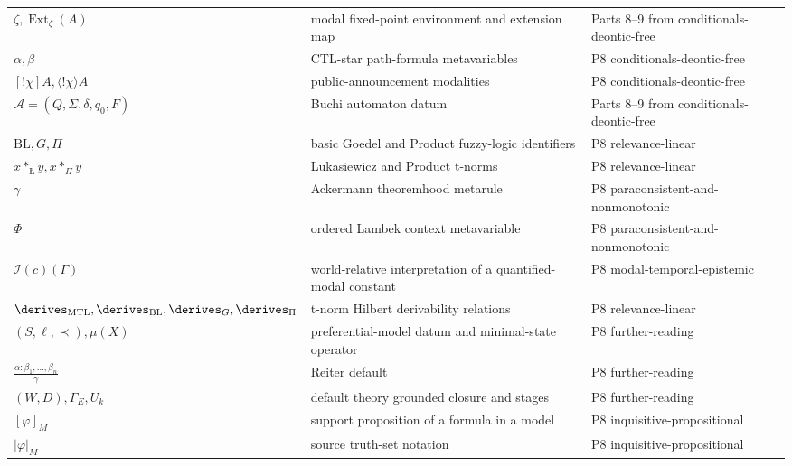 \begin{longtable}{@{}p{}p{}p{}@{}}
\(\zeta,\allowbreak \operatorname{Ext}_{\zeta}(A)\) & modal fixed-point environment and extension map & Parts 8--9 from conditionals-\allowbreak{}deontic-\allowbreak{}free \\
\(\alpha,\allowbreak \beta\) & CTL-star path-formula metavariables & P8 conditionals-\allowbreak{}deontic-\allowbreak{}free \\
\([!\chi]A,\allowbreak \langle!\chi\rangle A\) & public-announcement modalities & P8 conditionals-\allowbreak{}deontic-\allowbreak{}free \\
\(\mathcal A=(Q,\allowbreak \Sigma,\allowbreak \delta,\allowbreak q_0,\allowbreak F)\) & Buchi automaton datum & Parts 8--9 from conditionals-\allowbreak{}deontic-\allowbreak{}free \\
\(\mathrm{BL},\allowbreak G,\allowbreak \Pi\) & basic Goedel and Product fuzzy-logic identifiers & P8 relevance-\allowbreak{}linear \\
\(x\mathbin{\ast_{\text{\L}}}y,\allowbreak x\mathbin{\ast_{\Pi}}y\) & Lukasiewicz and Product t-norms & P8 relevance-\allowbreak{}linear \\
\(\gamma\) & Ackermann theoremhood metarule & P8 paraconsistent-\allowbreak{}and-\allowbreak{}nonmonotonic \\
\(\Phi\) & ordered Lambek context metavariable & P8 paraconsistent-\allowbreak{}and-\allowbreak{}nonmonotonic \\
\(\mathcal I(c)(\Gamma)\) & world-relative interpretation of a quantified-modal constant & P8 modal-\allowbreak{}temporal-\allowbreak{}epistemic \\
\(\derives_{\mathrm{MTL}},\allowbreak \derives_{\mathrm{BL}},\allowbreak \derives_G,\allowbreak \derives_{\Pi}\) & t-norm Hilbert derivability relations & P8 relevance-\allowbreak{}linear \\
\((S,\allowbreak \ell,\allowbreak \prec),\allowbreak \mu(X)\) & preferential-model datum and minimal-state operator & P8 further-\allowbreak{}reading \\
\(\frac{\alpha:\beta_1,\ldots,\beta_n}{\gamma}\) & Reiter default & P8 further-\allowbreak{}reading \\
\((W,\allowbreak D),\allowbreak \Gamma_E,\allowbreak U_k\) & default theory grounded closure and stages & P8 further-\allowbreak{}reading \\
\([\varphi]_M\) & support proposition of a formula in a model & P8 inquisitive-\allowbreak{}propositional \\
\(|\varphi|_M\) & source truth-set notation & P8 inquisitive-\allowbreak{}propositional \\

\end{longtable}
